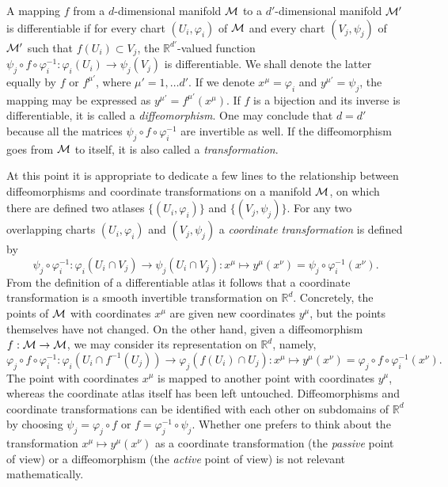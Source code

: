 \documentclass[
final,
11pt,
a4paper,
DIV=11,
headinclude=true,
footinclude=false,
bibliography=totoc,
twoside=true,  %
BCOR=5mm
]{scrbook}
\begin{document}
A mapping $f$ from a $d$-dimensional manifold $\mathcal{M}$ to a 
$d'$-dimensional manifold $\mathcal{M}'$ is differentiable if for 
every chart $(U_i,\varphi_i)$ of $\mathcal{M}$ and every chart 
$(V_j,\psi_j)$ of $\mathcal{M}'$ such that $f(U_i) \subset V_j$, the 
$\mathds{R}^{d'}$-valued function $\psi_j \circ f \circ 
\varphi_i^{-1} : \varphi_i(U_i) \to \psi_j(V_j)$ is 
differentiable. We shall denote the latter equally by $f$ or 
$f^{\mu'}$, where $\mu'=1,\ldots d'$. If we denote $x^\mu 
= \varphi_i$ and $y^{\mu'}=\psi_j$, the mapping may be expressed 
as $y^{\mu'} = f^{\mu'}(x^\mu)$. If $f$ is a bijection and its 
inverse is differentiable, it is called a \emph{diffeomorphism}.  
One may conclude that $d = d'$ because all the matrices $\psi_j 
\circ f \circ \varphi_i^{-1}$ are invertible as well. If the 
diffeomorphism goes from $\mathcal{M}$ to itself, it is also called 
a \emph{transformation}.

At this point it is appropriate to dedicate a few lines to the 
relationship between diffeomorphisms and coordinate 
transformations on a manifold $\mathcal{M}$, on which there are 
defined two atlases $\{(U_i,\varphi_i)\}$ and $\{(V_j,\psi_j)\}$.  
For any two overlapping charts $(U_i,\varphi_i)$ and 
$(V_j,\psi_j)$ a \emph{coordinate transformation} is defined by
\begin{equation*}
  \psi_j \circ \varphi_i^{-1} : \varphi_i(U_i \cap V_j) \to 
  \psi_j(U_i \cap V_j) : x^\mu \mapsto y^\mu(x^\nu) = \psi_j 
  \circ \varphi_i^{-1}(x^\nu).
\end{equation*}
From the definition of a differentiable atlas it follows that a 
coordinate transformation is a smooth invertible transformation 
on $\mathds{R}^d$. Concretely, the points of $\mathcal{M}$ with 
coordinates $x^\mu$ are given new coordinates $y^\mu$, but the 
points themselves have not changed.  On the other hand, given a 
diffeomorphism $f: \mathcal{M} \to \mathcal{M}$, we may consider its 
representation on $\mathds{R}^d$, namely,
\begin{equation*}
  \varphi_j \circ f \circ \varphi_i^{-1} : \varphi_i(U_i \cap 
  f^{-1}(U_j)) \to \varphi_j( f(U_i) \cap U_j): x^\mu \mapsto 
  y^\mu(x^\nu) = \varphi_j \circ f \circ \varphi_i^{-1}(x^\nu).
\end{equation*}
The point with coordinates $x^\mu$ is mapped to another point 
with coordinates $y^\mu$, whereas the coordinate atlas itself has 
been left untouched. Diffeomorphisms and coordinate 
transformations can be identified with each other on subdomains 
of $\mathds{R}^d$ by choosing $\psi_j = \varphi_j \circ f$ or $f 
= \varphi^{-1}_j \circ \psi_j$.  Whether one prefers to think 
about the transformation $x^\mu \mapsto y^\mu(x^\nu)$ as a 
coordinate transformation (the \emph{passive} point of view) or a 
diffeomorphism (the \emph{active} point of view) is not relevant 
mathematically.
\end{document}
